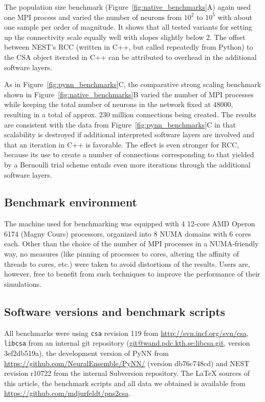\documentclass{frontiersSCNS} %
\newcommand{\Figure}[2]{Figure~\ref{#2}}
\newcommand{\Figure}[2]{Figure~#1}
\begin{document}
The population size benchmark (\Figure{5}{fig:native_benchmarks}A) again used
one MPI process and varied the number of neurons from $10^2$ to $10^5$
with about one sample per order of magnitude. It shows that all tested
variants for setting up the connectivity scale equally well with
slopes slightly below 2. The offset between NEST's RCC (written in
C++, but called repeatedly from Python) to the CSA object iterated in
C++ can be attributed to overhead in the additional software layers.

As in \Figure{4}{fig:pynn_benchmarks}C, the comparative strong
scaling benchmark shown in \Figure{5}{fig:native_benchmarks}B varied
the number of MPI processes while keeping the total number of neurons
in the network fixed at $48000$, resulting in a total of approx. 230
million connections being created. The results are consistent with the
data from \Figure{4}{fig:pynn_benchmarks}C in that scalability is
destroyed if additional interpreted software layers are involved and
that an iteration in C++ is favorable. The effect is even stronger for
RCC, because its use to create a number of connections corresponding
to that yielded by a Bernoulli trial scheme entails even more
iterations through the additional software layers.

\subsection{Benchmark environment}

The machine used for benchmarking was equipped with 4 12-core AMD
Operon 6174 (Magny Cours) processors, organized into 8 NUMA domains
with 6 cores each. Other than the choice of the number of MPI
processes in a NUMA-friendly way, no measures (like pinning of
processes to cores, altering the affinity of threads to cores, etc.)
were taken to avoid distortions of the results. Users are, however,
free to benefit from such techniques to improve the performance of
their simulations.

\subsection{Software versions and benchmark scripts}

All benchmarks were using \verb|csa| revision 119 from
\url{http://svn.incf.org/svn/csa}, \verb|libcsa| from an internal git
repository (\url{git@wand.pdc.kth.se:libcsa.git}, version 3ef2db519a),
the development version of PyNN from
\url{https://github.com/NeuralEnsemble/PyNN/} (version db76c748cd) and
NEST revision r10722 from the internal Subversion repository. The
\LaTeX{}  sources of this article, the benchmark scripts and all data we
obtained is available from
\url{https://github.com/mdjurfeldt/pns2csa}.
\end{document}
